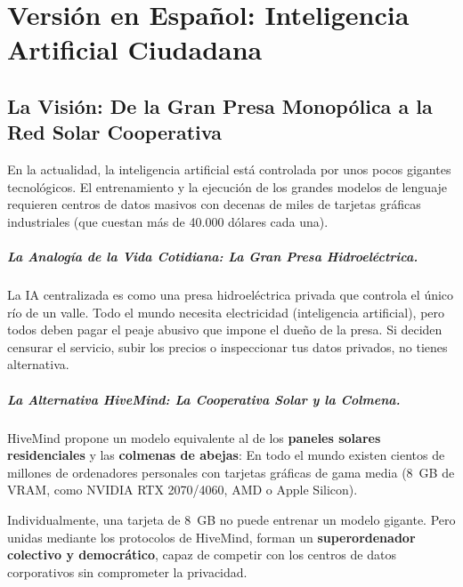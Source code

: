 \documentclass[11pt,a4paper]{report}
\begin{document}
\newpage

\chapter{Versión en Español: Inteligencia Artificial Ciudadana}
\label{chap:es}

\section{La Visión: De la Gran Presa Monopólica a la Red Solar Cooperativa}

En la actualidad, la inteligencia artificial está controlada por unos pocos gigantes tecnológicos. El entrenamiento y la ejecución de los grandes modelos de lenguaje requieren centros de datos masivos con decenas de miles de tarjetas gráficas industriales (que cuestan más de 40.000 dólares cada una).

\paragraph{La Analogía de la Vida Cotidiana: La Gran Presa Hidroeléctrica.}
La IA centralizada es como una presa hidroeléctrica privada que controla el único río de un valle. Todo el mundo necesita electricidad (inteligencia artificial), pero todos deben pagar el peaje abusivo que impone el dueño de la presa. Si deciden censurar el servicio, subir los precios o inspeccionar tus datos privados, no tienes alternativa.

\paragraph{La Alternativa HiveMind: La Cooperativa Solar y la Colmena.}
HiveMind propone un modelo equivalente al de los \textbf{paneles solares residenciales} y las \textbf{colmenas de abejas}:
En todo el mundo existen cientos de millones de ordenadores personales con tarjetas gráficas de gama media (8~GB de VRAM, como NVIDIA RTX 2070/4060, AMD o Apple Silicon). 

Individualmente, una tarjeta de 8~GB no puede entrenar un modelo gigante. Pero unidas mediante los protocolos de HiveMind, forman un \textbf{superordenador colectivo y democrático}, capaz de competir con los centros de datos corporativos sin comprometer la privacidad.
\end{document}
